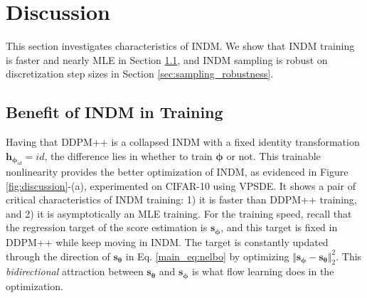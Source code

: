 \documentclass{article}
\theoremstyle{definition}
\theoremstyle{remark}
\begin{document}
	\section{Discussion}\label{sec:discussion}
	
	This section investigates characteristics of INDM. We show that INDM training is faster and nearly MLE in Section \ref{sec:better_optimization}, and INDM sampling is robust on discretization step sizes in Section \ref{sec:sampling_robustness}.
	
	\subsection{Benefit of INDM in Training}\label{sec:better_optimization}
		
	Having that DDPM++ is a collapsed INDM with a fixed identity transformation $\mathbf{h}_{\bm{\phi}_{id}}=id$, the difference lies in whether to train $\bm{\phi}$ or not. This trainable nonlinearity provides the better optimization of INDM, as evidenced in Figure \ref{fig:discussion}-(a), experimented on CIFAR-10 using VPSDE. It shows a pair of critical characteristics of INDM training: 1) it is faster than DDPM++ training, and 2) it is asymptotically an MLE training. For the training speed, recall that the regression target of the score estimation is $\mathbf{s}_{\bm{\phi}}$, and this target is fixed in DDPM++ while keep moving in INDM. The target is constantly updated through the direction of $\mathbf{s}_{\bm{\theta}}$ in Eq. \eqref{main_eq:nelbo} by optimizing $\Vert\mathbf{s}_{\bm{\phi}}-\mathbf{s}_{\bm{\theta}}\Vert_{2}^{2}$. This \textit{bidirectional} attraction between $\mathbf{s}_{\bm{\theta}}$ and $\mathbf{s}_{\bm{\phi}}$ is what flow learning does in the optimization.
	
\end{document}
